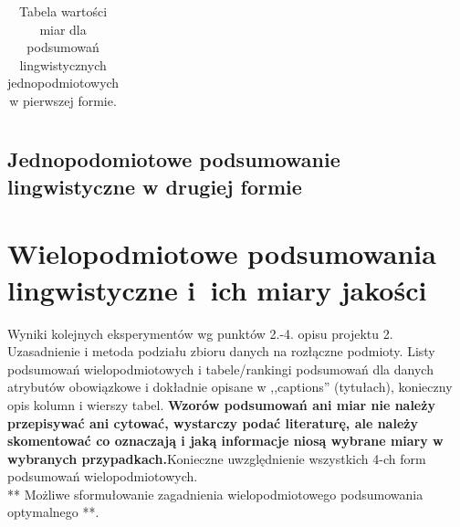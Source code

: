 \documentclass{classrep}
\begin{document}
\begin{center}
\begin{table}[H]
\begin{tabularx}{\textwidth}{ccccccccccccc}
  \end{tabularx}
  \caption{Tabela wartości miar dla podsumowań lingwistycznych jednopodmiotowych w pierwszej formie.}
\end{table}
\end{center}


\subsection{Jednopodomiotowe podsumowanie lingwistyczne w drugiej formie}

 
% 
% 
\section{Wielopodmiotowe podsumowania lingwistyczne i~ich miary jakości} 
Wyniki kolejnych eksperymentów wg punktów 2.-4. opisu projektu 2. Uzasadnienie i
metoda podziału zbioru danych na rozłączne podmioty. Listy podsumowań
wielopodmiotowych i tabele/rankingi podsumowań dla danych atrybutów obowiązkowe i
dokładnie opisane w ,,captions'' (tytułach), konieczny opis kolumn i wierszy tabel.
{\bf Wzorów podsumowań ani miar nie należy przepisywać ani cytować, wystarczy podać literaturę, ale
należy skomentować co oznaczają i jaką informacje niosą wybrane miary w wybranych
przypadkach.}Konieczne uwzględnienie wszystkich 4-ch form podsumowań wielopodmiotowych. 
\\ 

** Możliwe sformułowanie zagadnienia wielopodmiotowego podsumowania optymalnego **.\\
\\

\end{document}
